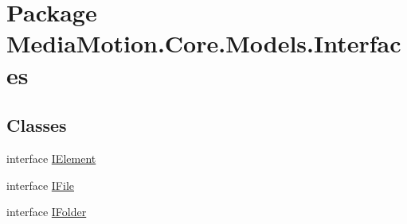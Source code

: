 \hypertarget{namespace_media_motion_1_1_core_1_1_models_1_1_interfaces}{\section{Package Media\+Motion.\+Core.\+Models.\+Interfaces}
\label{namespace_media_motion_1_1_core_1_1_models_1_1_interfaces}
}
\subsection*{Classes}
\begin{DoxyCompactItemize}
\item 
interface \hyperlink{interface_media_motion_1_1_core_1_1_models_1_1_interfaces_1_1_i_element}{I\+Element}
\item 
interface \hyperlink{interface_media_motion_1_1_core_1_1_models_1_1_interfaces_1_1_i_file}{I\+File}
\item 
interface \hyperlink{interface_media_motion_1_1_core_1_1_models_1_1_interfaces_1_1_i_folder}{I\+Folder}
\end{DoxyCompactItemize}
